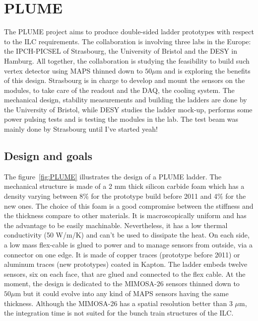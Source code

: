   \section{PLUME}

  The \gls{PLUME} project aims to produce double-sided ladder prototypes with respect to the \gls{ILC} requirements.
  The collaboration is involving three labs in the Europe: the IPCH-PICSEL of Strasbourg, the University of Bristol and the DESY in Hamburg.
  All together, the collaboration is studying the feasibility to build such vertex detector using \gls{MAPS} thinned down to $50 \mu\text{m}$ and is exploring the benefits of this design.
  Strasbourg is in charge to develop and mount the sensors on the modules, to take care of the readout and the \gls{DAQ}, the cooling system.
  The mechanical design, stability measurements and building the ladders are done by the University of Bristol, while DESY studies the ladder mock-up, performs some power pulsing tests and is testing the modules in the lab.
  The test beam was mainly done by Strasbourg until I've started yeah!

    \subsection{Design and goals}

    The figure~\ref{fig:PLUME} illustrates the design of a PLUME ladder.
    The mechanical structure is made of a 2 mm thick silicon carbide foam which has a density varying between 8\% for the prototype build before 2011 and 4\% for the new ones.
    The choice of this foam is a good compromise between the stiffness and the thickness compare to other materials. 
    It is macroscopically uniform and has the advantage to be easily machinable.
    Nevertheless, it has a low thermal conductivity (50 W/m/K) and can't be used to dissipate the heat.
    On each side, a low mass flex-cable is glued to power and to manage sensors from outside, via a connector on one edge.
    It is made of copper traces (prototype before 2011) or aluminum traces (new prototypes) coated in Kapton. 
    The ladder embeds twelve sensors, six on each face, that are glued and connected to the flex cable.
    At the moment, the design is dedicated to the MIMOSA-26 sensors thinned down to $50 \mu\text{m}$ but it could evolve into any kind of \gls{MAPS} sensors having the same thickness. 
    Although the MIMOSA-26 has a spatial resolution better than 3 $\mu$m, the integration time is not suited for the bunch train structures of the \gls{ILC}.

